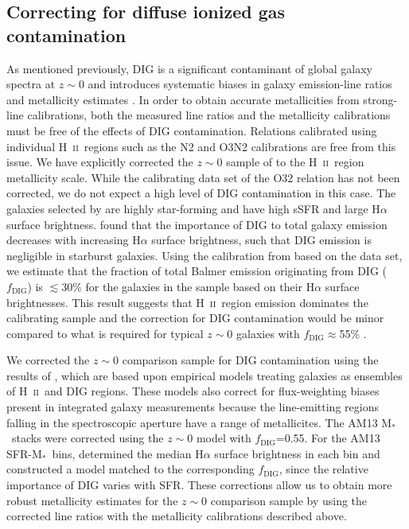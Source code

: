\documentclass[iop,twocolappendix]{emulateapj}
\newcommand{\mstar}{$\mbox{M}_*$}
\newcommand{\hii}{H~\textsc{ii}\ }
\newcommand{\fdig}{$f_{\text{DIG}}$}
\begin{document}
\subsection{Correcting for diffuse ionized gas contamination}

As mentioned previously, DIG is a significant contaminant of global galaxy
 spectra at $z\sim0$ and introduces systematic biases in galaxy emission-line ratios and
 metallicity estimates \citep{san17}.  In order to obtain accurate metallicities from
 strong-line calibrations, both the measured line ratios and the metallicity calibrations
 must be free of the effects of DIG contamination.  Relations calibrated using individual
 \hii regions such as the \citet{pet04} N2 and O3N2 calibrations are free from this issue.
  We have explicitly corrected the $z\sim0$ sample of \citet{bro16} to the \hii region
 metallicity scale.  While the calibrating data set of the \citet{jon15} O32 relation has
 not been corrected, we do not expect a high level of DIG contamination in this case.
  The galaxies selected by \citet{jon15} are highly star-forming and have high sSFR and
 large H$\alpha$ surface brightness.  \citet{oey07} found that the importance of DIG to
 total galaxy emission decreases with increasing H$\alpha$ surface brightness, such that
 DIG emission is negligible in starburst galaxies.  Using the calibration from \citet{san17}
 based on the \citet{oey07} data set, we estimate that the fraction of total Balmer emission
 originating from DIG (\fdig) is $\lesssim30$\% for the galaxies in the \citet{jon15} sample 
based on their H$\alpha$ surface brightnesses.
  This result suggests that \hii region
 emission dominates the \citet{jon15} calibrating sample and the correction for DIG contamination
 would be minor compared to what is required for typical $z\sim0$ galaxies with \fdig$\approx$55\%
 \citep{san17}.

We corrected the $z\sim0$ comparison sample for DIG contamination using the results of \citet{san17},
 which are based upon empirical models treating galaxies as ensembles of \hii and DIG regions.
  These models also correct for flux-weighting biases present in integrated galaxy measurements because
 the line-emitting regions falling in the spectroscopic aperture have a range of metallicites.
  The AM13 \mstar\ stacks were corrected using the $z\sim0$ model with \fdig=0.55.
  For the AM13 SFR-\mstar\ bins, \citet{san17} determined the median H$\alpha$ surface brightness
 in each bin and constructed a model matched to the corresponding $f_{\text{DIG}}$, since
 the relative importance of DIG varies with SFR.  These corrections allow us to obtain
 more robust metallicity estimates for the $z\sim0$ comparison sample by using the corrected
 line ratios with the metallicity calibrations described above.
\end{document}
